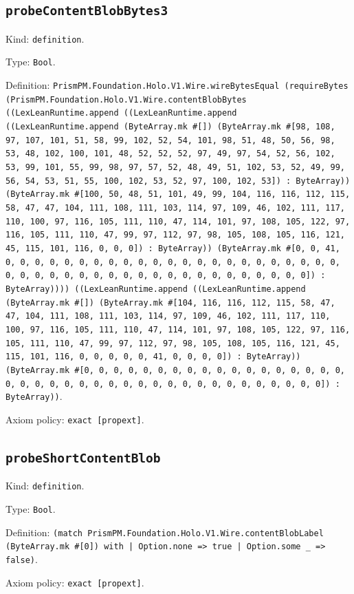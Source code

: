 \documentclass[11pt]{article}
\begin{document}
\subsection*{\texttt{probeContentBlobBytes3}}
\noindent Kind: \texttt{definition}.\par
\noindent Type: \texttt{Bool}.\par
\noindent Definition: \texttt{PrismPM.Foundation.Holo.V1.Wire.wireBytesEqual (requireBytes (PrismPM.Foundation.Holo.V1.Wire.contentBlobBytes ((LexLeanRuntime.append ((LexLeanRuntime.append ((LexLeanRuntime.append (ByteArray.mk \#[]) (ByteArray.mk \#[98, 108, 97, 107, 101, 51, 58, 99, 102, 52, 54, 101, 98, 51, 48, 50, 56, 98, 53, 48, 102, 100, 101, 48, 52, 52, 52, 97, 49, 97, 54, 52, 56, 102, 53, 99, 101, 55, 99, 98, 97, 57, 52, 48, 49, 51, 102, 53, 52, 49, 99, 56, 54, 53, 51, 55, 100, 102, 53, 52, 97, 100, 102, 53]) : ByteArray)) (ByteArray.mk \#[100, 50, 48, 51, 101, 49, 99, 104, 116, 116, 112, 115, 58, 47, 47, 104, 111, 108, 111, 103, 114, 97, 109, 46, 102, 111, 117, 110, 100, 97, 116, 105, 111, 110, 47, 114, 101, 97, 108, 105, 122, 97, 116, 105, 111, 110, 47, 99, 97, 112, 97, 98, 105, 108, 105, 116, 121, 45, 115, 101, 116, 0, 0, 0]) : ByteArray)) (ByteArray.mk \#[0, 0, 41, 0, 0, 0, 0, 0, 0, 0, 0, 0, 0, 0, 0, 0, 0, 0, 0, 0, 0, 0, 0, 0, 0, 0, 0, 0, 0, 0, 0, 0, 0, 0, 0, 0, 0, 0, 0, 0, 0, 0, 0, 0, 0, 0, 0]) : ByteArray)))) ((LexLeanRuntime.append ((LexLeanRuntime.append (ByteArray.mk \#[]) (ByteArray.mk \#[104, 116, 116, 112, 115, 58, 47, 47, 104, 111, 108, 111, 103, 114, 97, 109, 46, 102, 111, 117, 110, 100, 97, 116, 105, 111, 110, 47, 114, 101, 97, 108, 105, 122, 97, 116, 105, 111, 110, 47, 99, 97, 112, 97, 98, 105, 108, 105, 116, 121, 45, 115, 101, 116, 0, 0, 0, 0, 0, 41, 0, 0, 0, 0]) : ByteArray)) (ByteArray.mk \#[0, 0, 0, 0, 0, 0, 0, 0, 0, 0, 0, 0, 0, 0, 0, 0, 0, 0, 0, 0, 0, 0, 0, 0, 0, 0, 0, 0, 0, 0, 0, 0, 0, 0, 0, 0, 0, 0, 0, 0]) : ByteArray))}.\par
\noindent Axiom policy: \texttt{exact [propext]}.\par
\subsection*{\texttt{probeShortContentBlob}}
\noindent Kind: \texttt{definition}.\par
\noindent Type: \texttt{Bool}.\par
\noindent Definition: \texttt{(match PrismPM.Foundation.Holo.V1.Wire.contentBlobLabel (ByteArray.mk \#[0]) with | Option.none => true | Option.some \_ => false)}.\par
\noindent Axiom policy: \texttt{exact [propext]}.\par
\end{document}
